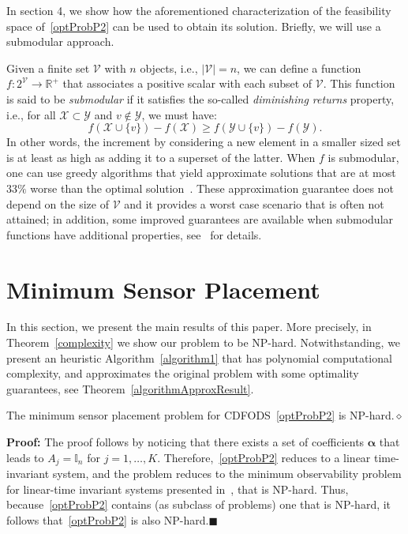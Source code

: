 In section 4, we show how the aforementioned characterization of the feasibility space of~\eqref{optProbP2} can be used to obtain its solution. Briefly, we will use a submodular approach. 

Given a finite set $\mathcal V$ with $n$ objects, i.e., $|\mathcal V|=n$, we can define a function $f:2^{\mathcal V}\rightarrow \mathbb{R}^+$ that associates a positive scalar with each subset of $\mathcal V$. This function is said to be \emph{submodular} if it satisfies the so-called \emph{diminishing returns} property, i.e., for all $\mathcal X\subset \mathcal Y$ and $v\notin \mathcal Y$, we must have: $$f(\mathcal X\cup \{v\})-f(\mathcal X)\ge f(\mathcal Y\cup \{v\})-f(\mathcal Y).$$ In other words, the increment by considering a new element in a smaller sized set is at least as high as adding it to a superset of the latter. When $f$ is submodular, one can use greedy algorithms that yield approximate solutions that are at most $33\%$ worse than the optimal solution~\cite{Nemhauser}. These approximation guarantee does not depend on the size of $\mathcal V$ and it provides a worst case scenario that is often not attained; in addition, some improved guarantees are available when submodular functions have additional properties, see~\cite{LinBilmes} for details.

\section{Minimum Sensor Placement}\label{mainResults}

In this section, we present the main results of this paper. More precisely, in Theorem~\ref{complexity} we show our problem to be NP-hard. Notwithstanding, we present an heuristic  Algorithm~\ref{algorithm1} that has polynomial computational complexity, and approximates the original problem with some optimality guarantees, see Theorem~\ref{algorithmApproxResult}. 



\begin{theorem}
The minimum sensor placement problem for CDFODS~\eqref{optProbP2} is NP-hard.\hfill $\diamond$
\label{complexity}
\end{theorem}

\textbf{Proof: }
The proof follows by noticing that there exists a set of coefficients $\mathbf{\alpha}$ that leads to $A_j=\mathbb{I}_n$ for $j=1,\ldots,K$. Therefore,~\eqref{optProbP2} reduces to a linear time-invariant system, and the problem reduces to the minimum observability problem for linear-time invariant systems presented in~\cite{MinControlProb}, that is NP-hard. Thus, because~\eqref{optProbP2} contains (as subclass of problems) one that is NP-hard, it follows that~\eqref{optProbP2} is also NP-hard.\hfill $\blacksquare$






